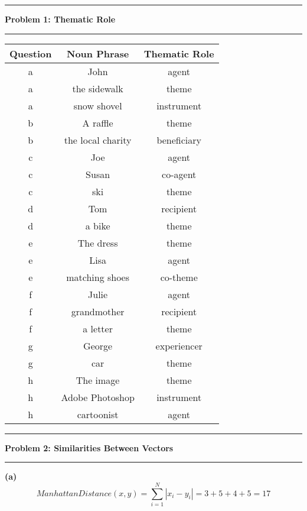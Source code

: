 \documentclass[11pt]{article}
\newcommand\question[2]{\vspace{.25in}\hrule\textbf{#1: #2}\vspace{.5em}\hrule\vspace{.10in}}
\renewcommand\part[1]{\vspace{.10in}\textbf{(#1)}}
\begin{document}
\raggedright

\newcommand\NAME{Jake Pitkin}
\newcommand\UID{u0891770}
\newcommand\HWNUM{3}

\question{Problem 1}{Thematic Role}

 \begin{table}[H]
\centering
{\renewcommand{\arraystretch}{1.2}%
\begin{tabular}{| c | c | c |}
\hline
\textbf{Question} & \textbf{Noun Phrase} & \textbf{Thematic Role}\\
\hline
a & John & agent\\ \hline
a & the sidewalk & theme\\ \hline
a & snow shovel & instrument\\ \hline
b & A raffle & theme\\ \hline
b & the local charity & beneficiary\\ \hline
c & Joe & agent\\ \hline
c & Susan & co-agent\\ \hline
c & ski & theme\\ \hline
d & Tom & recipient\\ \hline
d & a bike & theme\\ \hline
e & The dress & theme\\ \hline
e & Lisa & agent\\ \hline
e & matching shoes & co-theme\\ \hline
f & Julie & agent\\ \hline
f & grandmother & recipient\\ \hline
f & a letter & theme\\ \hline
g & George & experiencer\\ \hline
g & car & theme\\ \hline
h & The image & theme\\ \hline
h & Adobe Photoshop & instrument\\ \hline
h & cartoonist & agent\\ \hline
\end{tabular}}
\end{table}

\question{Problem 2}{Similarities Between Vectors}

\part{a}
$$ManhattanDistance(x, y) = \sum_{i = 1}^N |x_i - y_i| = 3 + 5 + 4 + 5 = 17$$

\end{document}
